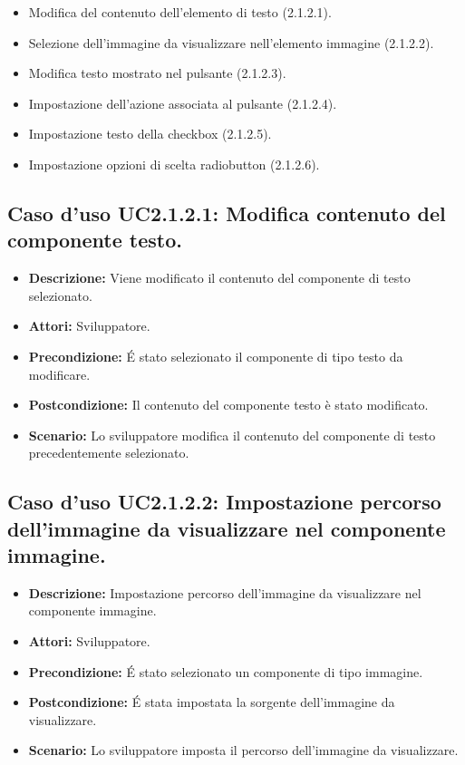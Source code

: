 \begin{itemize}
\begin{itemize}
\item Modifica del contenuto dell'elemento di testo (2.1.2.1).
\item Selezione dell'immagine da visualizzare nell'elemento immagine (2.1.2.2).
\item Modifica testo mostrato nel pulsante (2.1.2.3).
\item Impostazione dell'azione associata al pulsante (2.1.2.4).
\item Impostazione testo della checkbox (2.1.2.5).
\item Impostazione opzioni di scelta radiobutton (2.1.2.6). 
\end{itemize} 
\end{itemize}

\subsection{Caso d'uso UC2.1.2.1: Modifica contenuto del componente testo.}
\begin{itemize}
\item[]\textbf{Descrizione:} Viene modificato il contenuto del componente di testo selezionato.
\item[]\textbf{Attori:} Sviluppatore. 
\item[]\textbf{Precondizione:} \'E stato selezionato il componente di tipo testo da modificare. 
\item[]\textbf{Postcondizione:} Il contenuto del componente testo è stato modificato. 
\item[]\textbf{Scenario:}
 Lo sviluppatore modifica il contenuto del componente di testo precedentemente selezionato. 
\end{itemize}

\subsection{Caso d'uso UC2.1.2.2: Impostazione percorso dell'immagine da visualizzare nel componente immagine.}
\begin{itemize}
\item[]\textbf{Descrizione:} Impostazione percorso dell'immagine da visualizzare nel componente immagine.
\item[]\textbf{Attori:} Sviluppatore. 
\item[]\textbf{Precondizione:} \'E stato selezionato un componente di tipo immagine. 
\item[]\textbf{Postcondizione:} \'E stata impostata la sorgente dell'immagine da visualizzare. 
\item[]\textbf{Scenario:}
 Lo sviluppatore imposta il percorso dell'immagine da visualizzare. 
\end{itemize}

